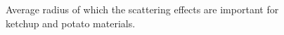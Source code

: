 \begin{figure}[h]
\centering
{}
\caption{Average radius of which the scattering effects are important for ketchup and potato materials.}
\label{fig:radiuscolor}
\end{figure}

